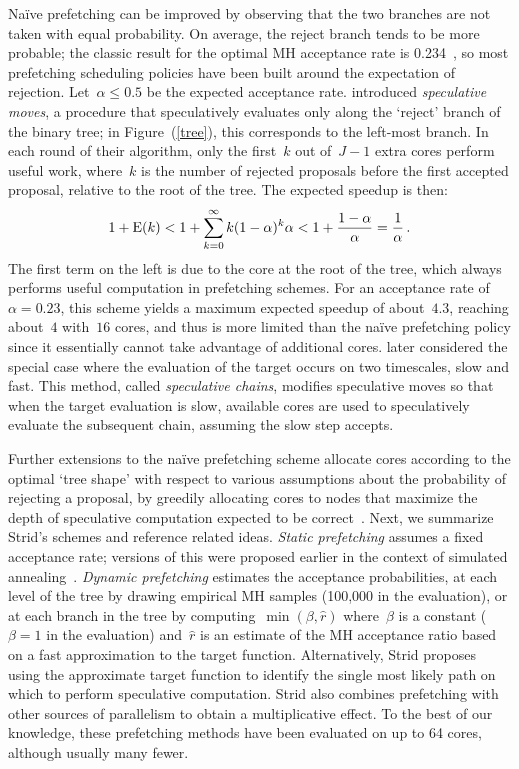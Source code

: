 \documentclass[angelino.tex]{subfiles}
\begin{document}
Na\"{i}ve prefetching can be improved by observing that the two branches are not 
taken with equal probability.
On average, the reject branch tends to be more probable;
the classic result for the optimal MH acceptance rate is 
0.234~\citep{roberts-1997-accept}, so most prefetching scheduling policies
have been built around the expectation of rejection.
Let~${\alpha \le 0.5}$ be the expected acceptance rate. 
\citet{byrd-2008-SMP} introduced \emph{speculative moves}, a procedure that 
speculatively evaluates only along the `reject' branch of the binary tree;
in Figure~(\ref{tree}), this corresponds to the left-most branch.
In each round of their algorithm, only the first~$k$ out of~${J-1}$ extra cores 
perform useful work, where~$k$ is the number of rejected proposals before the
first accepted proposal, relative to the root of the tree.
The expected speedup is then:
\begin{align*}
1 + \mbox{E}(k) < 1 + \sum_{k=0}^\infty k (1-\alpha)^k \alpha
< 1 + \frac{1-\alpha}{\alpha} = \frac{1}{\alpha}\,.
\end{align*}
The first term on the left is due to the core at the root of the tree, 
which always performs useful computation in prefetching schemes.
For an acceptance rate of ${\alpha=0.23}$, this scheme yields a maximum expected 
speedup of about~$4.3$, reaching about~$4$ with~$16$ cores, and thus is more 
limited than the na\"{i}ve prefetching policy since it essentially cannot take 
advantage of additional cores.
\citet{byrd-2010-speculative} later considered the special case where the
evaluation of the target occurs on two timescales, slow and fast.
This method, called \emph{speculative chains}, modifies speculative moves so
that when the target evaluation is slow, available cores are used to 
speculatively evaluate the subsequent chain, assuming the slow step accepts.

Further extensions to the na\"{i}ve prefetching scheme allocate cores according
to the optimal `tree shape' with respect to various assumptions about the
probability of rejecting a proposal, \ie by greedily allocating cores to nodes
that maximize the depth of speculative computation expected to be 
correct~\citep{strid-2010-prefetching}.
Next, we summarize Strid's schemes and reference related ideas.
\emph{Static prefetching} assumes a fixed acceptance rate; versions of this were
proposed earlier in the context of simulated annealing~\citep{witte-1991-SA}.
\emph{Dynamic prefetching} estimates the acceptance probabilities,
\eg at each level of the tree by drawing empirical MH samples (100,000 in the 
evaluation), or at each  branch in the tree by computing~$\min(\beta, \hat{r})$ 
where~$\beta$ is a constant (${\beta = 1}$ in the evaluation) and~$\hat{r}$ is
an estimate of the MH acceptance ratio based on a fast approximation to the
target function. 
Alternatively, Strid proposes using the approximate target function to identify
the single most likely path on which to perform speculative computation.
Strid also combines prefetching with other sources of parallelism to obtain a 
multiplicative effect.
To the best of our knowledge, these prefetching methods have been
evaluated on up to 64 cores, although usually many fewer.
\end{document}
